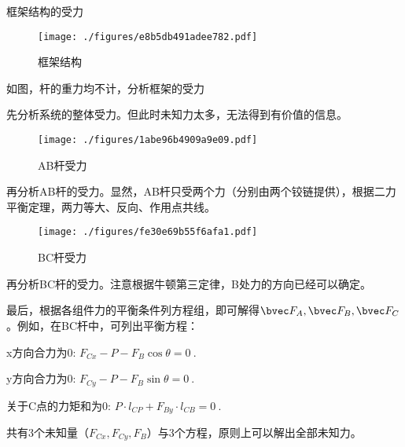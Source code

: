\begin{example}{框架结构的受力}
\begin{figure}[ht]
\centering
\texttt{[image: ./figures/e8b5db491adee782.pdf]}
\caption{框架结构} \label{fig_RGDFA_9}
\end{figure}
如图，杆的重力均不计，分析框架的受力

先分析系统的整体受力。但此时未知力太多，无法得到有价值的信息。

\begin{figure}[ht]
\centering
\texttt{[image: ./figures/1abe96b4909a9e09.pdf]}
\caption{AB杆受力} \label{fig_RGDFA_10}
\end{figure}

再分析AB杆的受力。显然，AB杆只受两个力（分别由两个铰链提供），根据二力平衡定理，两力等大、反向、作用点共线。

\begin{figure}[ht]
\centering
\texttt{[image: ./figures/fe30e69b55f6afa1.pdf]}
\caption{BC杆受力} \label{fig_RGDFA_11}
\end{figure}
再分析BC杆的受力。注意根据牛顿第三定律，B处力的方向已经可以确定。

最后，根据各组件力的平衡条件列方程组，即可解得$\bvec F_A, \bvec F_B, \bvec F_C$。例如，在BC杆中，可列出平衡方程：

x方向合力为0: $F_{Cx}-P-F_{B} \cos \theta=0~.$

y方向合力为0: $F_{Cy}-P-F_{B}\sin \theta=0~.$

关于C点的力矩和为0: $P \cdot l_{CP} + F_{By} \cdot l_{CB} = 0~.$

共有3个未知量（$F_{Cx}, F_{Cy}, F_B$）与3个方程，原则上可以解出全部未知力。
\end{example}
